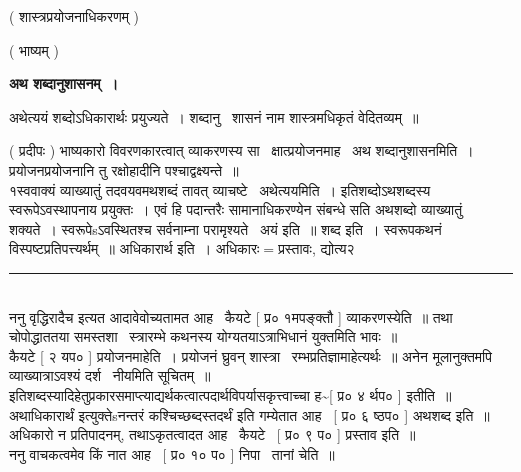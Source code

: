 \documentclass[11pt, openany]{book}
\begin{document}
\begin{multicols}{2}
\begin{center}
 ( शास्त्रप्रयोजनाधिकरणम् ) 

 ( भाष्यम् ) 

\textbf{\large अथ शब्दानुशासनम्~।}
\end{center}

{\qt अथेत्ययं शब्दोऽधिकारार्थः प्रयुज्यते~। शब्दानु \textendash\ शासनं नाम शास्त्रमधिकृतं वेदितव्यम्~॥}

 ( प्रदीपः ) भाष्यकारो विवरणकारत्वात् व्याकरणस्य सा \textendash\ क्षात्प्रयोजनमाह \textendash\ अथ शब्दानुशासनमिति~। प्रयोजनप्रयोजनानि तु रक्षोहादीनि पश्चाद्वक्ष्यन्ते~॥\\

१स्ववाक्यं व्याख्यातुं तदवयवमथशब्दं तावत् व्याचष्टे \textendash\ अथेत्ययमिति~। इतिशब्दोऽथशब्दस्य स्वरूपेऽवस्थापनाय प्रयुक्तः~। एवं हि पदान्तरैः सामानाधिकरण्येन संबन्धे सति {\qt अथ}शब्दो व्याख्यातुं शक्यते~। स्वरूपेsऽवस्थितश्च सर्वनाम्ना परामृश्यते \textendash\ {\qt अयं} इति~॥ शब्द इति~। स्वरूपकथनं विस्पष्टप्रतिपत्त्यर्थम्~॥ अधिकारार्थ इति~। अधिकारः$=$प्रस्तावः, द्योत्य२ \textendash\ \\

\noindent
\rule{1\linewidth}{0.5pt}\\

ननु {\qt वृद्धिरादैच} इत्यत आदावेवोच्यतामत आह \textendash\ कैयटे [ प्र० १मपङ्क्तौ ] व्याकरणस्येति~॥ तथा चोपोद्धाततया समस्तशा \textendash\ स्त्रारम्भे कथनस्य योग्यतयाऽत्राभिधानं युक्तमिति भावः~॥\\

कैयटे [ २ यप० ] प्रयोजनमाहेति~। प्रयोजनं घ्रुवन् शास्त्रा \textendash\ रम्भप्रतिज्ञामाहेत्यर्थः~॥ अनेन मूलानुक्तमपि व्याख्यात्राऽवश्यं दर्श \textendash\ नीयमिति सूचितम्~॥\\

इतिशब्दस्यादिहेतुप्रकारसमाप्त्याद्यर्थकत्वात्पदार्थविपर्यासकृत्त्वाच्चा ह\textasciitilde [ प्र० ४ र्थप० ] इतीति~॥ \\

अथाधिकारार्थं इत्युक्तेsनन्तरं कश्चिच्छब्दस्तदर्थं इति गम्येतात आह \textendash\ [ प्र० ६ ष्ठप० ] अथशब्द इति~॥\\

अधिकारो न प्रतिपादनम्, तथाऽकृतत्वादत आह \textendash\ कैयटे \textendash\ [ प्र० ९ प० ] प्रस्ताव इति~॥\\

ननु वाचकत्वमेव किं नात आह \textendash\ [ प्र० १० प० ] निपा \textendash\ तानां चेति~॥\\


\end{multicols}
\end{document}
